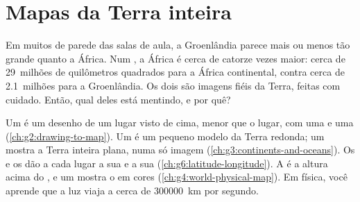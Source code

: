 \chapter{Mapas da Terra inteira}\label{ch:g9:maps-of-the-earth}

Em muitos  de parede das salas de aula, a Groenlândia parece mais ou
menos tão grande quanto a África. Num , a África é cerca de catorze
vezes maior: cerca de 29~milhões de quilômetros quadrados para a África
continental, contra cerca de 2.1~milhões para a Groenlândia. Os dois são
imagens fiéis da Terra, feitas com cuidado. Então, qual deles está
mentindo, e por quê?

\begin{recall}
Um  é um desenho de um lugar visto de cima, menor que o lugar, com uma
 e uma  (\cref{ch:g2:drawing-to-map}). Um  é um pequeno
modelo da Terra redonda; um  mostra a Terra inteira plana, numa
só imagem (\cref{ch:g3:continents-and-oceans}). Os  e os
 dão a cada lugar a sua  e a sua 
(\cref{ch:g6:latitude-longitude}). A  é a altura acima do , e um  mostra o  em cores
(\cref{ch:g4:world-physical-map}). Em física, você aprende que a luz
viaja a cerca de \qty{300000}{km} por segundo.
\end{recall}

